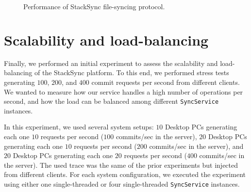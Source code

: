 \begin{figure}[t]
  \centering
	\caption{Performance of StackSync file-syncing protocol.}
  \vspace{-5pt}
  \label{fig:synchronization_time}
\end{figure}


\section{Scalability and load-balancing}

Finally, we performed an initial experiment to assess the scalability and load-balancing of 
the StackSync platform. To this end, we performed stress tests generating $100$, $200$, and
$400$ commit requests per second from different clients. We wanted to measure how our service
handles a high number of operations per second, and how the load can be balanced among different
\texttt{SyncService} instances.

In this experiment, we used several system setups: $10$ Desktop PCs generating each one $10$ 
requests per second ($100$ commits/sec in the server), $20$ Desktop PCs generating each one
$10$ requests per second ($200$ commits/sec in the server), and $20$ Desktop PCs generating
each one $20$ requests per second ($400$ commits/sec in the server). 
The used trace was the same of the prior experiments but injected from different clients.
For each system configuration, we executed the experiment using either one single-threaded or four single-threaded 
\texttt{SyncService} instances. 

